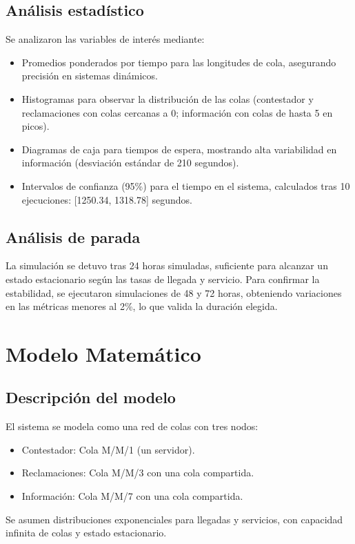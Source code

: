 \documentclass[12pt]{article}
\begin{document}
\subsection{Análisis estadístico}
Se analizaron las variables de interés mediante:
\begin{itemize}
    \item Promedios ponderados por tiempo para las longitudes de cola, asegurando precisión en sistemas dinámicos.
    \item Histogramas para observar la distribución de las colas (contestador y reclamaciones con colas cercanas a 0; información con colas de hasta 5 en picos).
    \item Diagramas de caja para tiempos de espera, mostrando alta variabilidad en información (desviación estándar de 210 segundos).
    \item Intervalos de confianza (95\%) para el tiempo en el sistema, calculados tras 10 ejecuciones: [1250.34, 1318.78] segundos.
\end{itemize}

\subsection{Análisis de parada}
La simulación se detuvo tras 24 horas simuladas, suficiente para alcanzar un estado estacionario según las tasas de llegada y servicio. Para confirmar la estabilidad, se ejecutaron simulaciones de 48 y 72 horas, obteniendo variaciones en las métricas menores al 2\%, lo que valida la duración elegida.

\section{Modelo Matemático}

\subsection{Descripción del modelo}
El sistema se modela como una red de colas con tres nodos:
\begin{itemize}
    \item Contestador: Cola M/M/1 (un servidor).
    \item Reclamaciones: Cola M/M/3 con una cola compartida.
    \item Información: Cola M/M/7 con una cola compartida.
\end{itemize}
Se asumen distribuciones exponenciales para llegadas y servicios, con capacidad infinita de colas y estado estacionario.
\end{document}
